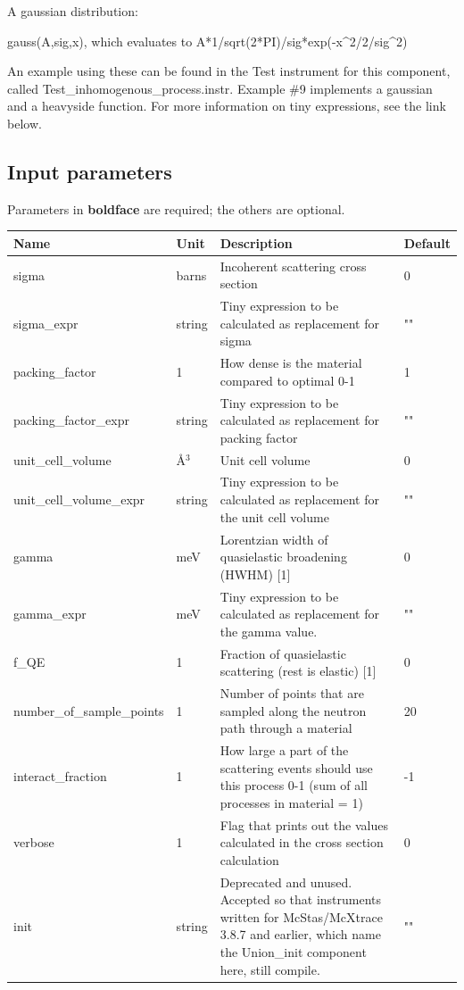 A gaussian distribution:

gauss(A,sig,x), which evaluates to A*1/sqrt(2*PI)/sig*exp(-x\textasciicircum{}2/2/sig\textasciicircum{}2)

An example using these can be found in the Test instrument for this component, called Test\_inhomogenous\_process.instr. Example \#9 implements a gaussian and a heavyside function. For more information on tiny expressions, see the link below.

\subsection*{Input parameters}
Parameters in \textbf{boldface} are required; the others are optional.

\begin{longtable}{p{}p{}p{}p{}}
\toprule
\textbf{Name} & \textbf{Unit} & \textbf{Description} & \textbf{Default} \\
\midrule
\endhead
sigma & barns & Incoherent scattering cross section & 0 \\
sigma\_expr & string & Tiny expression to be calculated as replacement for sigma & "" \\
packing\_factor & 1 & How dense is the material compared to optimal 0-1 & 1 \\
packing\_factor\_expr & string & Tiny expression to be calculated as replacement for packing factor & "" \\
unit\_cell\_volume & \AA{}$^{3}$ & Unit cell volume & 0 \\
unit\_cell\_volume\_expr & string & Tiny expression to be calculated as replacement for the unit cell volume & "" \\
gamma & meV & Lorentzian width of quasielastic broadening (HWHM) [1] & 0 \\
gamma\_expr & meV & Tiny expression to be calculated as replacement for the gamma value. & "" \\
f\_QE & 1 & Fraction of quasielastic scattering (rest is elastic) [1] & 0 \\
number\_of\_sample\_points & 1 & Number of points that are sampled along the neutron path through a material & 20 \\
interact\_fraction & 1 & How large a part of the scattering events should use this process 0-1 (sum of all processes in material = 1) & -1 \\
verbose & 1 & Flag that prints out the values calculated in the cross section calculation & 0 \\
init & string & Deprecated and unused. Accepted so that instruments written for McStas/McXtrace 3.8.7 and earlier, which name the Union\_init component here, still compile. & "" \\
\bottomrule
\end{longtable}

